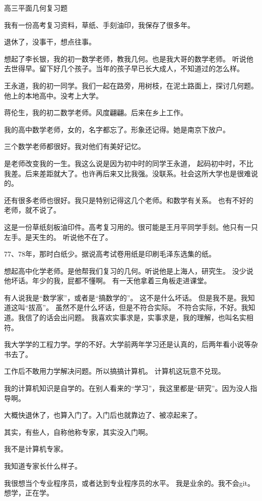 \documentclass[11pt]{article}
\def\newline{\vbox{}}
\begin{document}
\centerline{\Large 高三平面几何复习题}
\newline

\iffalse
我有一份高考复习资料，草纸、手刻油印，我保存了很多年。

退休了，没事干，想点往事。

想起了李长银，我的初一数学老师，教我几何。也是我大哥的数学老师。
听说他去世得早。留下好几个孩子。当年的孩子早已长大成人，不知道过的怎么样。

王永道，我的初一同学。我们一起在路旁，用树枝，在泥土路面上，探讨几何题。
他上的本地高中。没考上大学。

蒋伦生，我的初二数学老师。风度翩翩。后来在乡上工作。

我的高中数学老师，女的，名字都忘了。形象还记得。她是南京下放户。

三个数学老师都很好。我对他们有美好记忆。

是老师改变我的一生。我这么说是因为初中时的同学王永道，
起码初中时，不比我差。后来差距就大了。也许再后来又比我强。没联系。社会这所大学也是很难说的。

还有很多老师也很好。我只是特别记得这几个老师。和数学有关系。
也有不好的老师，就不说了。


这是一份草纸刻板油印件。高考复习用的。很可能是王月平同学手刻。他只有一只左手。是天生的。
听说他不在了。

77、78年，那时白纸少。据说高考试卷用纸是印刷毛泽东选集的纸。

想起高中化学老师。是他帮我们复习的几何。听说他是上海人，研究生。
没少说他坏话。年少的我，屁都不懂啊。
有一天他拿着三角板走进课堂。


有人说我是``数学家''，或者是``搞数学的''。
这不是什么坏话。
但是我不是。我知道这叫``拔高''。
虽然不是什么坏话，但是不符合实际。
不符合实际，不好。我知道。我信了的话会出问题。
我喜欢实事求是，实事求是，我的理解，也叫名实相符。

我大学学的工程力学。学的不好。大学前两年学习还是认真的，后两年看小说等杂书去了。

工作后不敢用力学解决问题。所以搞搞计算机。
计算机这玩意不兑现。

我的计算机知识是自学的。在别人看来的``学习''，我这里都是``研究''。因为没人指导啊。

大概快退休了，也算入门了。入门后也就靠边了、被凉起来了。

其实，有些人，自称他称专家，其实没入门啊。

我不是计算机专家。

我知道专家长什么样子。

我很想当个专业程序员，或者达到专业程序员的水平。
我是业余的。我不会git。想学，正在学。
\end{document}
